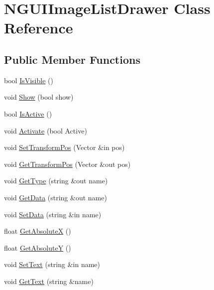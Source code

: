 \hypertarget{class_n_g_u_i_image_list_drawer}{}\section{N\+G\+U\+I\+Image\+List\+Drawer Class Reference}
\label{class_n_g_u_i_image_list_drawer}
\subsection*{Public Member Functions}
\begin{DoxyCompactItemize}
\item 
bool \hyperlink{class_n_g_u_i_image_list_drawer_a3ffc382b7b5cd24337968355ac7cd418}{Is\+Visible} ()
\item 
void \hyperlink{class_n_g_u_i_image_list_drawer_a000b63c6b9a10a17c9587da111e5ff86}{Show} (bool show)
\item 
bool \hyperlink{class_n_g_u_i_image_list_drawer_a389c9e3330f48a3106a90c0e61299c5d}{Is\+Active} ()
\item 
void \hyperlink{class_n_g_u_i_image_list_drawer_a00e2fafc98949821365e5bcf2aa06ffa}{Activate} (bool Active)
\item 
void \hyperlink{class_n_g_u_i_image_list_drawer_a465a9868b9f31fd1b81f0dfcd1e701d8}{Set\+Transform\+Pos} (Vector \&in pos)
\item 
void \hyperlink{class_n_g_u_i_image_list_drawer_a121b81c497f2142b4b4541ead0b6d1fd}{Get\+Transform\+Pos} (Vector \&out pos)
\item 
void \hyperlink{class_n_g_u_i_image_list_drawer_a5124fe7e041f46330b429eb77d064b7a}{Get\+Type} (string \&out name)
\item 
void \hyperlink{class_n_g_u_i_image_list_drawer_ad1c7e7a0045ec914eec9c43db7ee02f4}{Get\+Data} (string \&out name)
\item 
void \hyperlink{class_n_g_u_i_image_list_drawer_aa61af0b4d9172fee0f9d5eaf126655ef}{Set\+Data} (string \&in name)
\item 
float \hyperlink{class_n_g_u_i_image_list_drawer_a20c79252cba7958a49023edd8ceb690b}{Get\+AbsoluteX} ()
\item 
float \hyperlink{class_n_g_u_i_image_list_drawer_a988fbd6dc13de2390a45672dd66c1471}{Get\+AbsoluteY} ()
\item 
void \hyperlink{class_n_g_u_i_image_list_drawer_ab7aed12cc103d7ed6e5faf7c15bc8f0d}{Set\+Text} (string \&in name)
\item 
void \hyperlink{class_n_g_u_i_image_list_drawer_a84292773acd499aa26dabcf9fcd21ed1}{Get\+Text} (string \&name)

\end{DoxyCompactItemize}
